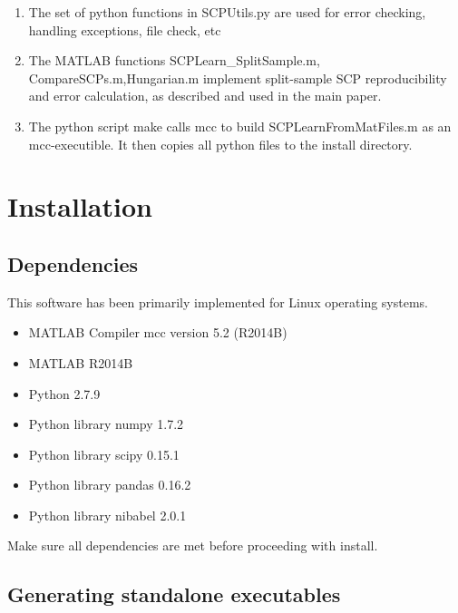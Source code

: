 \documentclass[12pt]{article}
\begin{document}
\begin{enumerate}
\item The set of python functions in {\color{blue}SCPUtils.py} are used for error checking, handling exceptions, file check, etc
\item The MATLAB functions {\color{magenta}SCPLearn\_SplitSample.m}, {\color{magenta}CompareSCPs.m},{\color{magenta}Hungarian.m} implement split-sample SCP reproducibility and error calculation, as described and used in the main paper.
\item The python script {\color{blue}make} calls mcc to build {\color{magenta}SCPLearnFromMatFiles.m} as an mcc-executible. It then copies all python files to the install directory.
\end{enumerate}

\section{Installation}
\subsection{Dependencies}
This software has been primarily implemented for Linux operating systems.
\begin{itemize}
\item MATLAB Compiler mcc version 5.2 (R2014B)
\item MATLAB R2014B
\item Python 2.7.9
\item Python library numpy 1.7.2
\item Python library scipy 0.15.1
\item Python library pandas 0.16.2
\item Python library nibabel 2.0.1
\end{itemize}
Make sure all dependencies are met before proceeding with install.

\subsection{Generating standalone executables}
\end{document}
